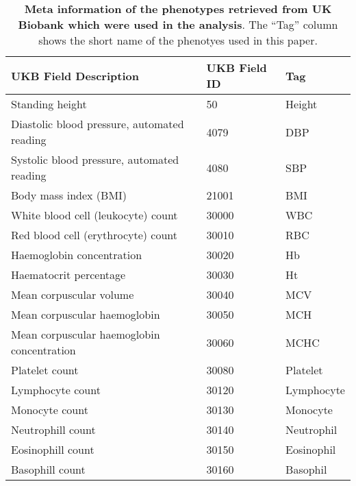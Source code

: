 \begin{table}[ht]
\centering
\begingroup\scriptsize
\begin{tabular}{lll}
  \toprule
{\textbf{UKB Field Description}} & {\textbf{UKB Field ID}} & {\textbf{Tag}} \\ 
  \midrule
Standing height & 50 & Height \\ 
  Diastolic blood pressure, automated reading & 4079 & DBP \\ 
  Systolic blood pressure, automated reading & 4080 & SBP \\ 
  Body mass index (BMI) & 21001 & BMI \\ 
  White blood cell (leukocyte) count & 30000 & WBC \\ 
  Red blood cell (erythrocyte) count & 30010 & RBC \\ 
  Haemoglobin concentration & 30020 & Hb \\ 
  Haematocrit percentage & 30030 & Ht \\ 
  Mean corpuscular volume & 30040 & MCV \\ 
  Mean corpuscular haemoglobin & 30050 & MCH \\ 
  Mean corpuscular haemoglobin concentration & 30060 & MCHC \\ 
  Platelet count & 30080 & Platelet \\ 
  Lymphocyte count & 30120 & Lymphocyte \\ 
  Monocyte count & 30130 & Monocyte \\ 
  Neutrophill count & 30140 & Neutrophil \\ 
  Eosinophill count & 30150 & Eosinophil \\ 
  Basophill count & 30160 & Basophil \\ 
   \bottomrule
\end{tabular}
\endgroup
\caption{\textbf{Meta information of the phenotypes retrieved from UK Biobank which were used in the analysis}. The ``Tag'' column shows the short name of the phenotyes used in this paper.} 
\label{tab:trait_table}
\end{table}
